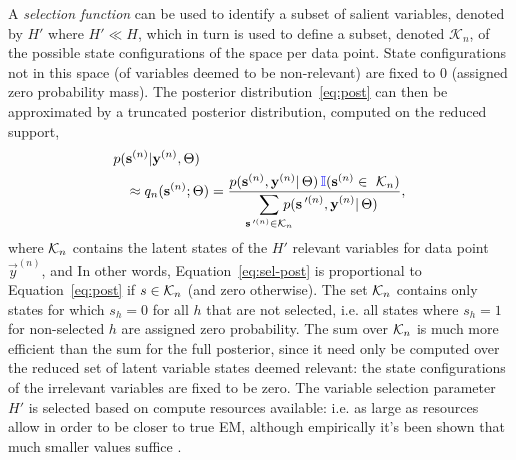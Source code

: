 A \textit{selection function} can be used to identify a  subset
of salient variables, denoted by $H'$ where $H' \ll H$, which in turn is used to define a subset, denoted $\mathcal{K}_n$, of the possible state configurations of the space per data point. 
State configurations not in this space (of variables deemed to be non-relevant) are fixed to $0$ (assigned zero probability mass).
%
The posterior distribution~\eqref{eq:post} can then be approximated by a truncated posterior distribution, computed on the reduced support,
%
\vspace{-.1cm}
\begin{align}
\label{eq:sel-post}
p(&\vec{s}^{(n)}|\vec{y}^{(n)},\Theta) \nonumber\\
&\approx q_n(\vec{s}^{(n)};\Theta) = \frac{p(\vec{s}^{(n)},\vec{y}^{(n)}|\,\Theta) \,\rev{\mathbb{I}}(\vec{s}^{(n)}\in\,\,\Kn)} %
{\disS\hspace{-1.5mm}\sum_{\vec{s}\Prime^{(n)}\in\mathcal{K}_n}\hspace{-3mm} p(\vec{s}\Prime^{(n)},\vec{y}^{(n)}|\,\Theta)},
\end{align}
\normalsize
%
where $\mathcal{K}_{n}$ contains the latent states of the $H'$ relevant variables for data point
$\vec{y}^{(n)}$, 
and 
In other words, Equation~\eqref{eq:sel-post} is proportional to Equation~\eqref{eq:post} if $s \in \mathcal{K}_{n}$ (and zero otherwise). 
The set $\mathcal{K}_{n}$ contains only states for which $s_h=0$ for all $h$ that are not selected, i.e. all states where $s_h=1$ for non-selected $h$ are assigned zero probability.
The sum over $\mathcal{K}_{n}$ is much more efficient than the sum for the full posterior, since it need only be computed over the reduced set of latent variable states deemed relevant: the state configurations of the irrelevant variables are fixed to be zero.
The variable selection parameter $H'$ is selected based on compute resources available: i.e. as large as resources allow in order to be closer to true EM, although empirically it's been shown that much smaller values suffice  \citep[see e.g.][App. B on complexity-accuracy trade-offs]{SheikhEtAl2014}.

